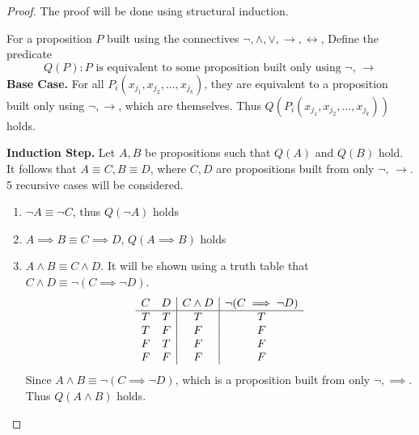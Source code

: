 \documentclass[11pt]{article}
\begin{document}
    \begin{proof}
        The proof will be done using structural induction.

        For a proposition \(P\) built using the connectives $\neg, \wedge, \vee, \rightarrow, \leftrightarrow$, Define the predicate
        \[
            Q(P) : P \text{ is equivalent to some proposition built only using } \neg \text{, } \rightarrow
        \]
        \textbf{Base Case.} For all \(P_i(x_{j_1}, x_{j_2}, \dots, x_{j_k})\), they are equivalent to a proposition built only using \(\neg, \rightarrow\), which are themselves. Thus \(Q(P_i(x_{j_1}, x_{j_2}, \dots, x_{j_k}))\) holds.

        \textbf{Induction Step.} Let \(A,B\) be propositions such that \(Q(A)\) and \(Q(B)\) hold. It follows that \(A\equiv C, B\equiv D\), where \(C, D\) are propositions built from only \(\neg \text{, } \rightarrow\). 5 recursive cases will be considered.

        \begin{enumerate}
            \item \(\neg A \equiv \neg C\), thus \(Q(\neg A)\) holds
            \item \(A \implies B \equiv C \implies D\), \(Q(A \implies B)\) holds
            \item \(A \land B \equiv C \land D\). It will be shown using a truth table that \(C \land D \equiv \neg(C\implies \neg D)\).
            \begin{displaymath}
                \begin{array}{c c | c | c}
                    C & D & C \land D & \neg(C\implies \neg D)\\
                    \hline
                    T & T & T & T\\
                    T & F & F & F\\
                    F & T & F & F\\
                    F & F & F & F\\
                \end{array}
            \end{displaymath}
            Since \(A \land B \equiv \neg(C\implies \neg D)\), which is a proposition built from only \(\neg, \implies\). Thus \(Q(A \land B)\) holds.


\end{enumerate}
\end{proof}
\end{document}
